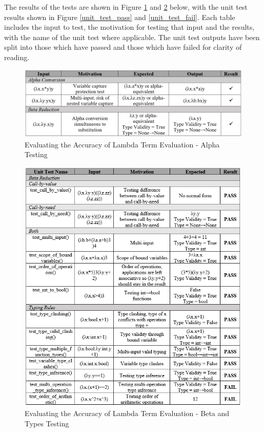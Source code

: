 \documentclass[a4paper,11pt]{report}
\begin{document}
The results of the tests are shown in Figure \ref{testing_log_alpha} and \ref{testing_log_beta_types} below, with the unit test results shown in Figure \ref{unit_test_pass} and \ref{unit_test_fail}. Each table includes the input to test, the motivation for testing that input and the results, with the name of the unit test where applicable. The unit test outputs have been split into those which have passed and those which have failed for clarity of reading.\\

\begin{figure}[p]
	\includegraphics[scale=0.6]{images/test_log_alpha}
	\centering
	\caption{Evaluating the Accuracy of Lambda Term Evaluation - Alpha Testing}
	\label{testing_log_alpha}
\end{figure}

\begin{figure}[p]
	\includegraphics[scale=0.8]{images/test_log_beta_types}
	\centering
	\caption{Evaluating the Accuracy of Lambda Term Evaluation - Beta and Types Testing}
	\label{testing_log_beta_types}
\end{figure}
\end{document}
